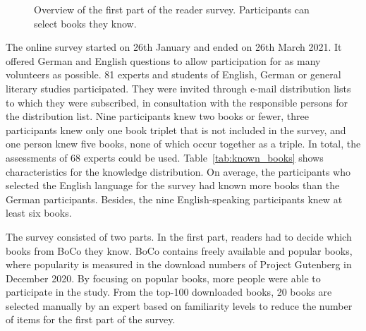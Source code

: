\documentclass[11pt]{article}
\begin{document}
\begin{figure}
	\centering
	\caption{Overview of the first part of the reader survey. Participants can select books they know.}
	\label{fig:survey1}
\end{figure}

The online survey started on 26th January and ended on 26th March 2021.
It offered German and English questions to allow participation for as many volunteers as possible.
81 experts and students of English, German or general literary studies participated.
They were invited through e-mail distribution lists to which they were subscribed, in consultation with the responsible persons for the distribution list.
Nine participants knew two books or fewer, three participants knew only one book triplet that is not included in the survey, and one person knew five books, none of which occur together as a triple.
In total, the assessments of 68 experts could be used.
Table~\ref{tab:known_books} shows characteristics for the knowledge distribution.
On average, the participants who selected the English language for the survey had known more books than the German participants.
Besides, the nine English-speaking participants knew at least six books.

The survey consisted of two parts.
In the first part, readers had to decide which books from BoCo they know.
BoCo contains freely available and popular books, where popularity is measured in the download numbers of Project Gutenberg in December 2020.
By focusing on popular books, more people were able to participate in the study.
From the top-100 downloaded books, 20 books are selected manually by an expert based on familiarity levels to reduce the number of items for the first part of the survey.
\end{document}
